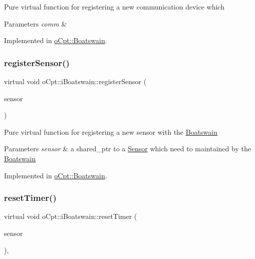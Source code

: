 Pure virtual function for registering a new communication device which 
\begin{DoxyParams}{Parameters}
{\em comm} & \\
\hline
\end{DoxyParams}


Implemented in \hyperlink{classo_cpt_1_1_boatswain_a7abff24ce1f199690a4890793ff8c23c}{o\+Cpt\+::\+Boatswain}.

\hypertarget{classo_cpt_1_1i_boatswain_aa9f9014202617a705d7ce21db2877222}{}\label{classo_cpt_1_1i_boatswain_aa9f9014202617a705d7ce21db2877222} 
\subsubsection{\texorpdfstring{register\+Sensor()}{registerSensor()}}
{\footnotesize\ttfamily virtual void o\+Cpt\+::i\+Boatswain\+::register\+Sensor (\begin{DoxyParamCaption}\item[{\hyperlink{classo_cpt_1_1i_sensor_a03533d2c5dc66e332d70dbb3b5e3006a}{i\+Sensor\+::ptr}}]{sensor }\end{DoxyParamCaption})\hspace{0.3cm}{\ttfamily [pure virtual]}}

Pure virtual function for registering a new sensor with the \hyperlink{classo_cpt_1_1_boatswain}{Boatswain} 
\begin{DoxyParams}{Parameters}
{\em sensor} & a shared\+\_\+ptr to a \hyperlink{classo_cpt_1_1_sensor}{Sensor} which need to maintained by the \hyperlink{classo_cpt_1_1_boatswain}{Boatswain} \\
\hline
\end{DoxyParams}


Implemented in \hyperlink{classo_cpt_1_1_boatswain_ab36071db5e3f8a0db0053b5553e508f0}{o\+Cpt\+::\+Boatswain}.

\hypertarget{classo_cpt_1_1i_boatswain_a863c877ec067c55b5e06a04d0d9648ce}{}\label{classo_cpt_1_1i_boatswain_a863c877ec067c55b5e06a04d0d9648ce} 
\subsubsection{\texorpdfstring{reset\+Timer()}{resetTimer()}}
{\footnotesize\ttfamily virtual void o\+Cpt\+::i\+Boatswain\+::reset\+Timer (\begin{DoxyParamCaption}\item[{\hyperlink{classo_cpt_1_1i_sensor_a03533d2c5dc66e332d70dbb3b5e3006a}{i\+Sensor\+::ptr}}]{sensor }\end{DoxyParamCaption})\hspace{0.3cm}{\ttfamily [protected]}, {}}


